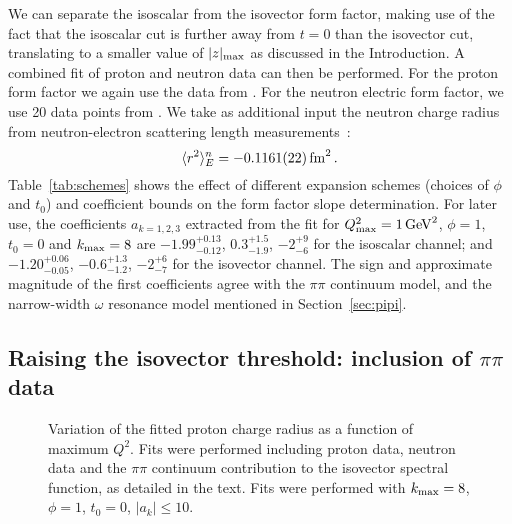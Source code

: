 \documentclass[12pt]{article}
\newcommand{\be}{\begin{equation}}
\newcommand{\ee}{\end{equation}}
\begin{document}
We can separate the 
isoscalar from the isovector form factor, making use of the fact that the isoscalar cut 
is further away from $t=0$ than the isovector cut, translating to a smaller value of $|z|_{\rm max}$ as discussed in 
the Introduction.  
A combined fit of proton and neutron data can then be performed.  
For the proton form factor we again use the data from \cite{Arrington:2007ux}.  
For the neutron electric form factor, we use 20 data points from 
\cite{
Bermuth:2003qh, 
Eden:1994ji,
:2008ha, 
Glazier:2004ny,
Golak:2000nt,
Herberg:1999ud, 
Ostrick:1999xa,
Passchier:1999cj,
Plaster:2005cx,
Rohe:1999sh,
Warren:2003ma,
Zhu:2001md}.
We take as additional input the neutron charge radius from 
neutron-electron scattering length measurements~\cite{Nakamura:2010}:
\be\label{eq:ren}
\langle r^2\rangle_E^n = -0.1161(22) \, {\rm fm}^2 \,. 
\ee
Table~\ref{tab:schemes} shows the effect of different expansion schemes (choices
of $\phi$ and $t_0$) and coefficient bounds on the form factor slope determination. 
For later use, the coefficients $a_{k=1,2,3}$  
extracted from the fit for $Q^2_{\rm max}=1\,{\rm GeV}^2$, $\phi=1$, $t_0=0$ and $k_{\rm max}=8$ 
are 
$-1.99^{+0.13}_{-0.12}$, $0.3^{+1.5}_{-1.9}$, $-2^{+9}_{-6}$ for the isoscalar channel; 
and
$-1.20^{+0.06}_{-0.05}$, $-0.6^{+1.3}_{-1.2}$, $-2^{+6}_{-7}$ for the isovector channel. 
The sign and approximate magnitude of the first coefficients agree with  
the $\pi\pi$ continuum model, and the narrow-width $\omega$ resonance model 
mentioned in Section~\ref{sec:pipi}. 

\subsection{Raising the isovector threshold: inclusion of $\pi\pi$ data}

\begin{figure}[h!]
\begin{center}
\caption{Variation of the fitted proton charge radius as a function of 
maximum $Q^2$.  Fits were performed including proton data, neutron data and the $\pi\pi$ continuum contribution
to the isovector spectral function, as detailed in the text.  
Fits were performed with $k_{\rm max}=8$, $\phi=1$, $t_0=0$, $|a_k|\le 10$. 
\label{fig:rcut}
 }
\end{center}
\end{figure}  
\end{document}
